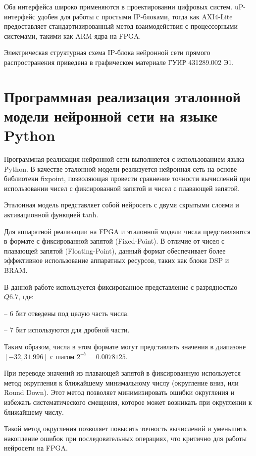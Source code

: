 Оба интерфейса широко применяются в проектировании цифровых систем. 
uP-интерфейс удобен для работы с простыми IP-блоками, тогда как 
AXI4-Lite предоставляет стандартизированный метод взаимодействия с 
процессорными системами, такими как ARM-ядра на FPGA.\@ 

Электрическая структурная схема IP-блока нейронной сети прямого распространения 
приведена в графическом материале ГУИР 431289.002 Э1.

\section{Программная реализация эталонной модели нейронной сети на языке Python}
\hspace*{12.5 mm}Программная реализация нейронной сети выполняется с 
использованием языка Python.  
В качестве эталонной модели реализуется нейронная сеть на основе библиотеки 
{fixpoint}, позволяющая провести сравнение точности вычислений при 
использовании чисел с фиксированной запятой и чисел с плавающей запятой.

Эталонная модель представляет собой нейросеть с двумя скрытыми слоями и 
активационной функцией {tanh}.  

Для аппаратной реализации на FPGA и эталонной модели числа представляются в 
формате с фиксированной запятой (Fixed-Point). В отличие от чисел с плавающей 
запятой (Floating-Point), данный формат обеспечивает более эффективное 
использование аппаратных ресурсов, таких как блоки DSP и BRAM.\@

В данной работе используется фиксированное представление с разрядностью $Q6.7$,
где:

  – 6 бит отведены под целую часть числа.

  – 7 бит используются для дробной части.

Таким образом, числа в этом формате могут представлять значения в диапазоне 
$[-32, 31.996]$ с шагом $2^{-7} = 0.0078125$.

При переводе значений из плавающей запятой в фиксированную используется метод 
округления к ближайшему минимальному числу (округление вниз, или Round Down). 
Этот метод позволяет минимизировать ошибки округления и избежать 
систематического смещения, которое может возникать при округлении к ближайшему 
числу.

Такой метод округления позволяет повысить точность вычислений и уменьшить 
накопление ошибок при последовательных операциях, что критично для работы 
нейросети на FPGA.\@

